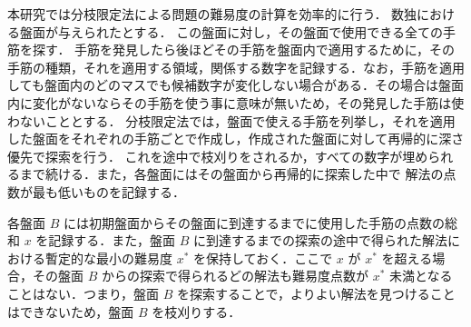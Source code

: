 \documentclass[submit,techrep,noauthor]{ipsj}
\newcommand{\saitohcom}[1]{\textbf{{\color{blue}{[saitoh comments: #1]}}}}
\begin{document}
本研究では分枝限定法による問題の難易度の計算を効率的に行う．
数独における盤面が与えられたとする．
この盤面に対し，その盤面で使用できる全ての手筋を探す．%
手筋を発見したら後ほどその手筋を盤面内で適用するために，その手筋の種類，それを適用する領域，関係する数字を記録する．なお，手筋を適用しても盤面内のどのマスでも候補数字が変化しない場合がある．その場合は盤面内に変化がないならその手筋を使う事に意味が無いため，その発見した手筋は使わないこととする．%
分枝限定法では，盤面で使える手筋を列挙し，それを適用した盤面をそれぞれの手筋ごとで作成し，作成された盤面に対して再帰的に深さ優先で探索を行う．%
これを途中で枝刈りをされるか，すべての数字が埋められるまで続ける．また，各盤面にはその盤面から再帰的に探索した中で%
解法の点数が最も低いものを記録する．%

各盤面 $B$ には初期盤面からその盤面に到達するまでに使用した手筋の点数の総和 $x$ を記録する．また，盤面 $B$ に到達するまでの探索の途中で得られた解法における暫定的な最小の難易度 $x^*$ を保持しておく．ここで $x$ が $x^*$ を超える場合，その盤面 $B$ からの探索で得られるどの解法も難易度点数が $x^*$ 未満となることはない．つまり，盤面 $B$ を探索することで，よりよい解法を見つけることはできないため，盤面 $B$ を枝刈りする．
\end{document}
